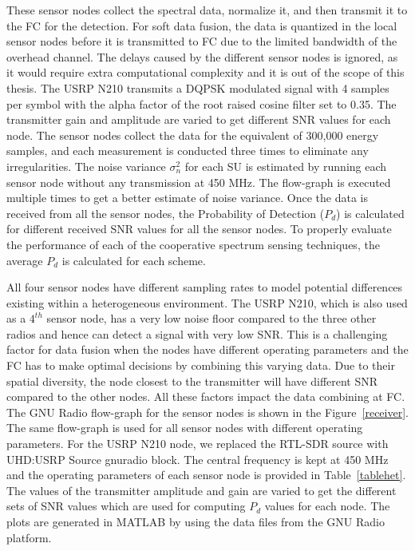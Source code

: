 These sensor nodes collect the spectral data, normalize it, and then transmit it to the FC for the detection. For soft data fusion, the data is quantized in the local sensor nodes before it is transmitted to FC due to the limited bandwidth of the overhead channel. The delays caused by the different sensor nodes is ignored, as it would require extra computational complexity and it is out of the scope of this thesis. The USRP N210 transmits a DQPSK modulated signal with 4 samples per symbol with the alpha factor of the root raised cosine filter set to 0.35. The transmitter gain and amplitude are varied to get different SNR values for each node. The sensor nodes collect the data for the equivalent of 300,000 energy samples, and each measurement is conducted three times to eliminate any irregularities. The noise variance $\sigma_n^2$ for each SU is estimated by running each sensor node without any transmission at 450 MHz. The flow-graph is executed multiple times to get a better estimate of noise variance. Once the data is received from all the sensor nodes, the Probability of Detection ($P_d$) is calculated for different received SNR values for all the sensor nodes. To properly evaluate the performance of each of the cooperative spectrum sensing techniques, the average $P_d$ is calculated for each scheme. 

All four sensor nodes have different sampling rates to model potential differences existing within a heterogeneous environment. The USRP N210, which is also used as a $4^{th}$ sensor node, has a very low noise floor compared to the three other radios and hence can detect a signal with very low SNR. This is a challenging factor for data fusion when the nodes have different operating parameters and the FC has to make optimal decisions by combining this varying data. Due to their spatial diversity, the node closest to the transmitter will have different SNR compared to the other nodes. All these factors impact the data combining at FC. The GNU Radio flow-graph for the sensor nodes is shown in the Figure~\ref{receiver}. The same flow-graph is used for all sensor nodes with different operating parameters. For the USRP N210 node, we replaced the RTL-SDR source with UHD:USRP Source gnuradio block. The central frequency is kept at 450 MHz and the operating parameters of each sensor node is provided in Table~\ref{tablehet}. The values of the transmitter amplitude and gain are varied to get the different sets of SNR values which are used for computing $P_d$ values for each node. The plots are generated in MATLAB by using the data files from the GNU Radio platform.

